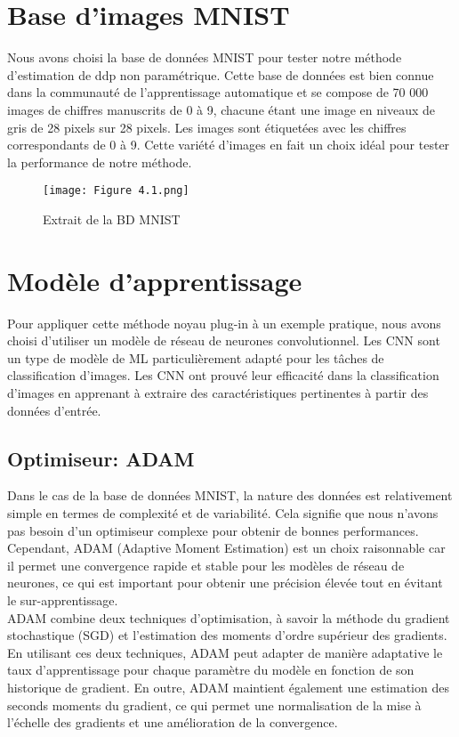 \section{Base d'images MNIST}

Nous avons choisi la base de données MNIST pour tester notre méthode d'estimation de ddp non paramétrique. Cette base de données est bien connue dans la communauté de l'apprentissage automatique et se compose de 70 000 images de chiffres manuscrits de 0 à 9, chacune étant une image en niveaux de gris de 28 pixels sur 28 pixels.  Les images sont étiquetées avec les chiffres correspondants de 0 à 9. Cette variété d'images en fait un choix idéal pour tester la performance de notre méthode.

\begin{figure}[!h]
  \centering
  \texttt{[image: Figure 4.1.png]}
  \caption{Extrait de la BD MNIST}
  \label{fig:Extrait de la BD MNIST}
\end{figure}
\clearpage 
\section{Modèle d’apprentissage}
Pour appliquer cette méthode noyau plug-in à un exemple pratique, nous avons choisi d'utiliser un modèle de réseau de neurones convolutionnel. Les CNN sont un type de modèle de ML particulièrement adapté pour les tâches de classification d'images. Les CNN ont prouvé leur efficacité dans la classification d'images en apprenant à extraire des caractéristiques pertinentes à partir des données d'entrée.

\subsection{Optimiseur: ADAM}
Dans le cas de la base de données MNIST, la nature des données est relativement simple en termes de complexité et de variabilité. Cela signifie que nous n'avons pas besoin d'un optimiseur complexe pour obtenir de bonnes performances. Cependant, ADAM (Adaptive Moment Estimation) est un choix raisonnable car il permet une convergence rapide et stable pour les modèles de réseau de neurones, ce qui est important pour obtenir une précision élevée tout en évitant le sur-apprentissage.\\ ADAM combine deux techniques d'optimisation, à savoir la méthode du gradient stochastique (SGD) et l'estimation des moments d'ordre supérieur des gradients. En utilisant ces deux techniques, ADAM peut adapter de manière adaptative le taux d'apprentissage pour chaque paramètre du modèle en fonction de son historique de gradient. En outre, ADAM maintient également une estimation des seconds moments du gradient, ce qui permet une normalisation de la mise à l'échelle des gradients et une amélioration de la convergence.

